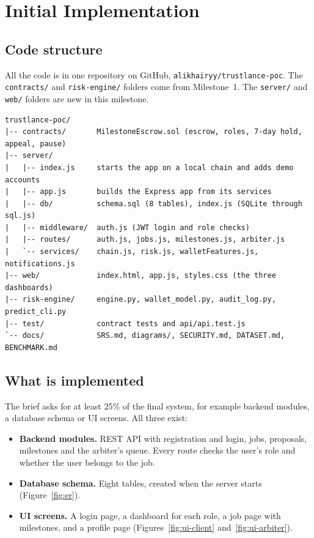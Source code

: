 \chapter{Initial Implementation}
\label{ch:impl}

\section{Code structure}
All the code is in one repository on GitHub, \texttt{alikhairyy/trustlance-poc}. The \texttt{contracts/} and \texttt{risk-engine/} folders come from Milestone~1. The \texttt{server/} and \texttt{web/} folders are new in this milestone.

\begin{lstlisting}
trustlance-poc/
|-- contracts/       MilestoneEscrow.sol (escrow, roles, 7-day hold, appeal, pause)
|-- server/
|   |-- index.js     starts the app on a local chain and adds demo accounts
|   |-- app.js       builds the Express app from its services
|   |-- db/          schema.sql (8 tables), index.js (SQLite through sql.js)
|   |-- middleware/  auth.js (JWT login and role checks)
|   |-- routes/      auth.js, jobs.js, milestones.js, arbiter.js
|   `-- services/    chain.js, risk.js, walletFeatures.js, notifications.js
|-- web/             index.html, app.js, styles.css (the three dashboards)
|-- risk-engine/     engine.py, wallet_model.py, audit_log.py, predict_cli.py
|-- test/            contract tests and api/api.test.js
`-- docs/            SRS.md, diagrams/, SECURITY.md, DATASET.md, BENCHMARK.md
\end{lstlisting}

\section{What is implemented}
The brief asks for at least 25\% of the final system, for example backend modules, a database schema or UI screens. All three exist:

\begin{itemize}
\item \textbf{Backend modules.} REST API with registration and login, jobs, proposals, milestones and the arbiter's queue. Every route checks the user's role and whether the user belongs to the job.
\item \textbf{Database schema.} Eight tables, created when the server starts (Figure~\ref{fig:er}).
\item \textbf{UI screens.} A login page, a dashboard for each role, a job page with milestones, and a profile page (Figures~\ref{fig:ui-client} and~\ref{fig:ui-arbiter}).
\end{itemize}

